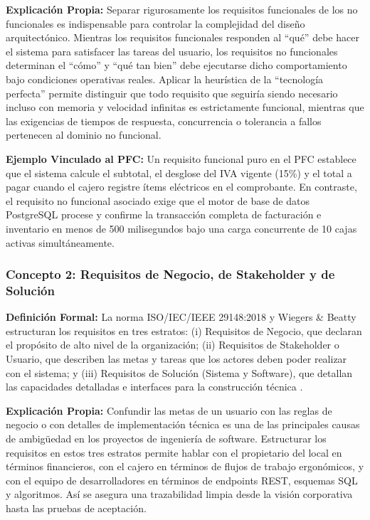 \textbf{Explicación Propia:} Separar rigurosamente los requisitos funcionales de los no funcionales es indispensable para controlar la complejidad del diseño arquitectónico. Mientras los requisitos funcionales responden al ``qué'' debe hacer el sistema para satisfacer las tareas del usuario, los requisitos no funcionales determinan el ``cómo'' y ``qué tan bien'' debe ejecutarse dicho comportamiento bajo condiciones operativas reales. Aplicar la heurística de la ``tecnología perfecta'' permite distinguir que todo requisito que seguiría siendo necesario incluso con memoria y velocidad infinitas es estrictamente funcional, mientras que las exigencias de tiempos de respuesta, concurrencia o tolerancia a fallos pertenecen al dominio no funcional.

\textbf{Ejemplo Vinculado al PFC:} Un requisito funcional puro en el PFC establece que el sistema calcule el subtotal, el desglose del IVA vigente (15\%) y el total a pagar cuando el cajero registre ítems eléctricos en el comprobante. En contraste, el requisito no funcional asociado exige que el motor de base de datos PostgreSQL procese y confirme la transacción completa de facturación e inventario en menos de 500 milisegundos bajo una carga concurrente de 10 cajas activas simultáneamente.

\subsubsection{Concepto 2: Requisitos de Negocio, de Stakeholder y de Solución}
\textbf{Definición Formal:} La norma ISO/IEC/IEEE 29148:2018 \cite{ieee29148} y Wiegers \& Beatty \cite{wiegers2013} estructuran los requisitos en tres estratos: (i) Requisitos de Negocio, que declaran el propósito de alto nivel de la organización; (ii) Requisitos de Stakeholder o Usuario, que describen las metas y tareas que los actores deben poder realizar con el sistema; y (iii) Requisitos de Solución (Sistema y Software), que detallan las capacidades detalladas e interfaces para la construcción técnica \cite{ieee29148, ireb2023}.

\textbf{Explicación Propia:} Confundir las metas de un usuario con las reglas de negocio o con detalles de implementación técnica es una de las principales causas de ambigüedad en los proyectos de ingeniería de software. Estructurar los requisitos en estos tres estratos permite hablar con el propietario del local en términos financieros, con el cajero en términos de flujos de trabajo ergonómicos, y con el equipo de desarrolladores en términos de endpoints REST, esquemas SQL y algoritmos. Así se asegura una trazabilidad limpia desde la visión corporativa hasta las pruebas de aceptación.

